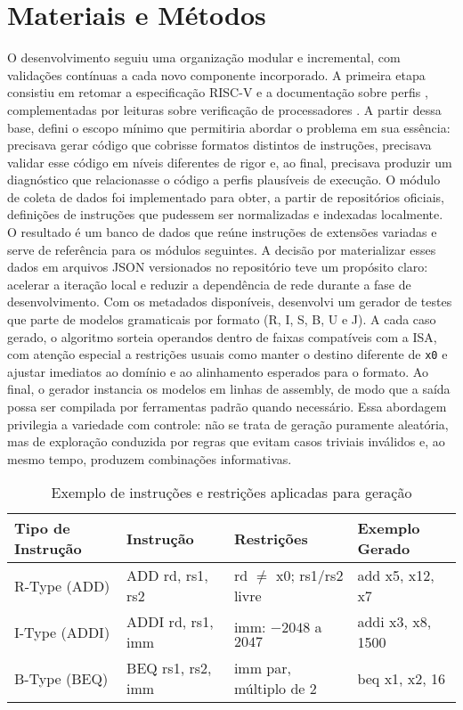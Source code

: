 \documentclass[12pt,a4paper]{article}
\begin{document}
\section{Materiais e Métodos}
O desenvolvimento seguiu uma organização modular e incremental, com validações contínuas a cada novo componente incorporado. A primeira etapa consistiu em retomar a especificação RISC-V \cite{riscv-priv} e a documentação sobre perfis \cite{riscv-profiles}, complementadas por leituras sobre verificação de processadores \cite{herdt2020,armstrong2019}. A partir dessa base, defini o escopo mínimo que permitiria abordar o problema em sua essência: precisava gerar código que cobrisse formatos distintos de instruções, precisava validar esse código em níveis diferentes de rigor e, ao final, precisava produzir um diagnóstico que relacionasse o código a perfis plausíveis de execução.
\newline
\noindent O módulo de coleta de dados foi implementado para obter, a partir de repositórios oficiais, definições de instruções que pudessem ser normalizadas e indexadas localmente. O resultado é um banco de dados que reúne instruções de extensões variadas e serve de referência para os módulos seguintes. A decisão por materializar esses dados em arquivos JSON versionados no repositório teve um propósito claro: acelerar a iteração local e reduzir a dependência de rede durante a fase de desenvolvimento.
\newline
\noindent Com os metadados disponíveis, desenvolvi um gerador de testes que parte de modelos gramaticais por formato (R, I, S, B, U e J). A cada caso gerado, o algoritmo sorteia operandos dentro de faixas compatíveis com a ISA, com atenção especial a restrições usuais como manter o destino diferente de \texttt{x0} e ajustar imediatos ao domínio e ao alinhamento esperados para o formato. Ao final, o gerador instancia os modelos em linhas de assembly, de modo que a saída possa ser compilada por ferramentas padrão quando necessário. Essa abordagem privilegia a variedade com controle: não se trata de geração puramente aleatória, mas de exploração conduzida por regras que evitam casos triviais inválidos e, ao mesmo tempo, produzem combinações informativas.
\newline

\begin{table}[h]
\centering
\begin{tabular}{llll}
\hline
\textbf{Tipo de Instrução} & \textbf{Instrução} & \textbf{Restrições} & \textbf{Exemplo Gerado} \\
\hline
R-Type (ADD) & ADD rd, rs1, rs2 & rd $\neq$ x0; rs1/rs2 livre & add x5, x12, x7 \\
I-Type (ADDI) & ADDI rd, rs1, imm & imm: $-2048$ a $2047$ & addi x3, x8, 1500 \\
B-Type (BEQ) & BEQ rs1, rs2, imm & imm par, múltiplo de 2 & beq x1, x2, 16 \\
\hline
\end{tabular}
\caption{Exemplo de instruções e restrições aplicadas para geração}
\label{tab:exemplos_geracao}
\end{table}
\end{document}
